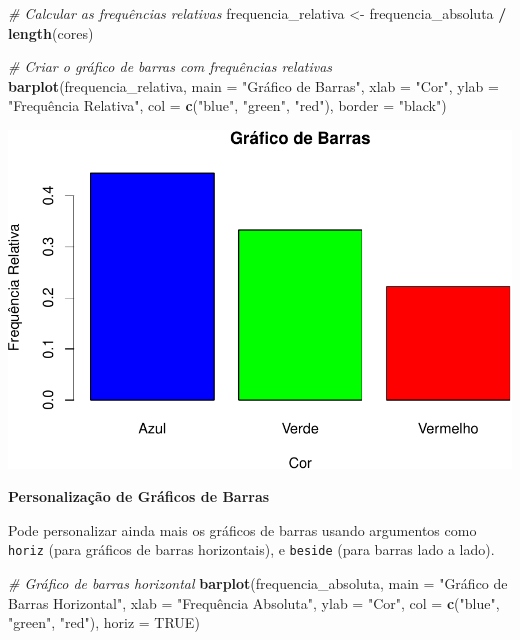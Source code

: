 \documentclass[
]{book}
\newenvironment{Shaded}{\begin{snugshade}}{\end{snugshade}}
\newcommand{\AttributeTok}[1]{\textcolor[rgb]{0.13,0.29,0.53}{#1}}
\newcommand{\CommentTok}[1]{\textcolor[rgb]{0.56,0.35,0.01}{\textit{#1}}}
\newcommand{\ConstantTok}[1]{\textcolor[rgb]{0.56,0.35,0.01}{#1}}
\newcommand{\FunctionTok}[1]{\textcolor[rgb]{0.13,0.29,0.53}{\textbf{#1}}}
\newcommand{\NormalTok}[1]{#1}
\newcommand{\OtherTok}[1]{\textcolor[rgb]{0.56,0.35,0.01}{#1}}
\newcommand{\SpecialCharTok}[1]{\textcolor[rgb]{0.81,0.36,0.00}{\textbf{#1}}}
\newcommand{\StringTok}[1]{\textcolor[rgb]{0.31,0.60,0.02}{#1}}
\begin{document}
\begin{Shaded}
\begin{Highlighting}[]
\CommentTok{\# Calcular as frequências relativas}
\NormalTok{frequencia\_relativa }\OtherTok{\textless{}{-}}\NormalTok{ frequencia\_absoluta }\SpecialCharTok{/} \FunctionTok{length}\NormalTok{(cores)  }
    
\CommentTok{\# Criar o gráfico de barras com frequências relativas}
\FunctionTok{barplot}\NormalTok{(frequencia\_relativa,         }
  \AttributeTok{main =} \StringTok{"Gráfico de Barras"}\NormalTok{,         }
  \AttributeTok{xlab =} \StringTok{"Cor"}\NormalTok{,         }
  \AttributeTok{ylab =} \StringTok{"Frequência Relativa"}\NormalTok{,}
  \AttributeTok{col =} \FunctionTok{c}\NormalTok{(}\StringTok{"blue"}\NormalTok{, }\StringTok{"green"}\NormalTok{, }\StringTok{"red"}\NormalTok{),}
  \AttributeTok{border =} \StringTok{"black"}\NormalTok{) }
\end{Highlighting}
\end{Shaded}

\includegraphics{introR_files/figure-latex/unnamed-chunk-163-1.pdf}

\textbf{Personalização de Gráficos de Barras}

Pode personalizar ainda mais os gráficos de barras usando argumentos
como \texttt{horiz} (para gráficos de barras horizontais), e \texttt{beside} (para
barras lado a lado).

\begin{Shaded}
\begin{Highlighting}[]
\CommentTok{\# Gráfico de barras horizontal}
\FunctionTok{barplot}\NormalTok{(frequencia\_absoluta, }
        \AttributeTok{main =} \StringTok{"Gráfico de Barras Horizontal"}\NormalTok{,}
        \AttributeTok{xlab =} \StringTok{"Frequência Absoluta"}\NormalTok{,}
        \AttributeTok{ylab =} \StringTok{"Cor"}\NormalTok{,}
        \AttributeTok{col =} \FunctionTok{c}\NormalTok{(}\StringTok{"blue"}\NormalTok{, }\StringTok{"green"}\NormalTok{, }\StringTok{"red"}\NormalTok{),}
        \AttributeTok{horiz =} \ConstantTok{TRUE}\NormalTok{)}
\end{Highlighting}
\end{Shaded}
\end{document}
